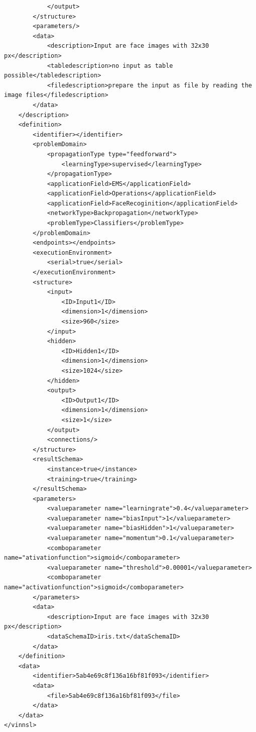 \begin{verbatim}
            </output>
        </structure>
        <parameters/>
        <data>
            <description>Input are face images with 32x30 px</description>
            <tabledescription>no input as table possible</tabledescription>
            <filedescription>prepare the input as file by reading the image files</filedescription>
        </data>
    </description>
    <definition>
        <identifier></identifier>
        <problemDomain>
            <propagationType type="feedforward">
                <learningType>supervised</learningType>
            </propagationType>
            <applicationField>EMS</applicationField>
            <applicationField>Operations</applicationField>
            <applicationField>FaceRecoginition</applicationField>
            <networkType>Backpropagation</networkType>
            <problemType>Classifiers</problemType>
        </problemDomain>
        <endpoints></endpoints>
        <executionEnvironment>
            <serial>true</serial>
        </executionEnvironment>
        <structure>
            <input>
                <ID>Input1</ID>
                <dimension>1</dimension>
                <size>960</size>
            </input>
            <hidden>
                <ID>Hidden1</ID>
                <dimension>1</dimension>
                <size>1024</size>
            </hidden>
            <output>
                <ID>Output1</ID>
                <dimension>1</dimension>
                <size>1</size>
            </output>
            <connections/>
        </structure>
        <resultSchema>
            <instance>true</instance>
            <training>true</training>
        </resultSchema>
        <parameters>
            <valueparameter name="learningrate">0.4</valueparameter>
            <valueparameter name="biasInput">1</valueparameter>
            <valueparameter name="biasHidden">1</valueparameter>
            <valueparameter name="momentum">0.1</valueparameter>
            <comboparameter name="ativationfunction">sigmoid</comboparameter>
            <valueparameter name="threshold">0.00001</valueparameter>
            <comboparameter name="activationfunction">sigmoid</comboparameter>
        </parameters>
        <data>
            <description>Input are face images with 32x30 px</description>
            <dataSchemaID>iris.txt</dataSchemaID>
        </data>
    </definition>
    <data>
        <identifier>5ab4e69c8f136a16bf81f093</identifier>
        <data>
            <file>5ab4e69c8f136a16bf81f093</file>
        </data>
    </data>
</vinnsl>
\end{verbatim}

